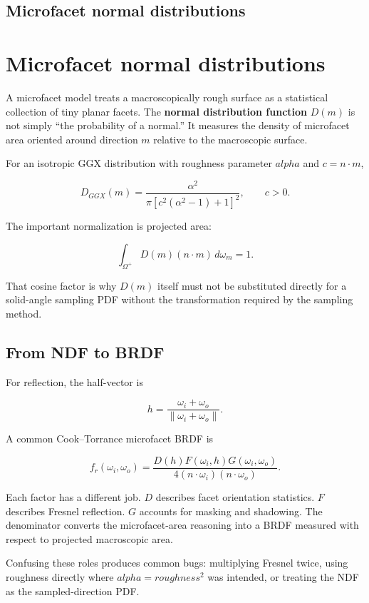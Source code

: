 \hypertarget{appendix-885c1cb64ae9}{}
\section*{Microfacet normal distributions}
\chapter{Microfacet normal distributions}\label{appendix-885c1cb64ae9-microfacet-normal-distributions}

A microfacet model treats a macroscopically rough surface as a statistical collection of tiny planar facets. The \textbf{normal distribution function} \(D(m)\) is not simply ``the probability of a normal.'' It measures the density of microfacet area oriented around direction \(m\) relative to the macroscopic surface.

For an isotropic GGX distribution with roughness parameter \(alpha\) and \(c = n\cdot m\),

\[
D_{GGX}(m)=
\frac{\alpha^2}
{\pi\left[c^2(\alpha^2-1)+1\right]^2},
\qquad c>0.
\]

The important normalization is projected area:

\[
\int_{\Omega^+} D(m)(n\cdot m)\,d\omega_m = 1.
\]

That cosine factor is why \(D(m)\) itself must not be substituted directly for a solid-angle sampling PDF without the transformation required by the sampling method.

\section{From NDF to BRDF}\label{appendix-885c1cb64ae9-from-ndf-to-brdf}

For reflection, the half-vector is

\[
h=\frac{\omega_i+\omega_o}{\|\omega_i+\omega_o\|}.
\]

A common Cook--Torrance microfacet BRDF is

\[
f_r(\omega_i,\omega_o)=
\frac{D(h)F(\omega_i,h)G(\omega_i,\omega_o)}
{4(n\cdot\omega_i)(n\cdot\omega_o)}.
\]

Each factor has a different job. \(D\) describes facet orientation statistics. \(F\) describes Fresnel reflection. \(G\) accounts for masking and shadowing. The denominator converts the microfacet-area reasoning into a BRDF measured with respect to projected macroscopic area.

Confusing these roles produces common bugs: multiplying Fresnel twice, using roughness directly where \(alpha=roughness^2\) was intended, or treating the NDF as the sampled-direction PDF.

